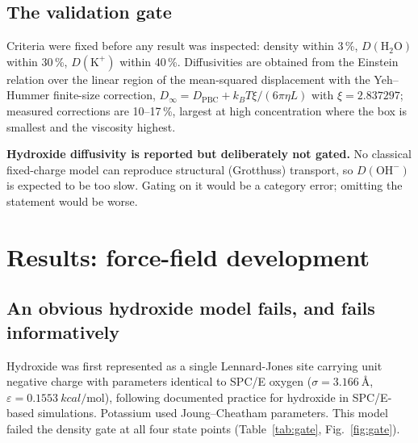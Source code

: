 \documentclass[11pt,a4paper]{article}
\begin{document}
\subsection{The validation gate}
Criteria were fixed before any result was inspected: density within 3\,\%, $D(\mathrm{H_2O})$ within
30\,\%, $D(\mathrm{K^+})$ within 40\,\%. Diffusivities are obtained from the Einstein relation over
the linear region of the mean-squared displacement with the Yeh--Hummer finite-size correction,
$D_\infty = D_{\mathrm{PBC}} + k_BT\xi/(6\pi\eta L)$ with $\xi = 2.837297$; measured corrections are
10--17\,\%, largest at high concentration where the box is smallest and the viscosity highest.

\textbf{Hydroxide diffusivity is reported but deliberately not gated.} No classical fixed-charge
model can reproduce structural (Grotthuss) transport, so $D(\mathrm{OH^-})$ is expected to be too
slow. Gating on it would be a category error; omitting the statement would be worse.

\section{Results: force-field development}\label{sec:res-ff}

\subsection{An obvious hydroxide model fails, and fails informatively}

Hydroxide was first represented as a single Lennard-Jones site carrying unit negative charge with
parameters identical to SPC/E oxygen ($\sigma = \SI{3.166}{\angstrom}$,
$\varepsilon = \SI{0.1553}{kcal\per\mole}$), following documented practice for hydroxide in
SPC/E-based simulations. Potassium used Joung--Cheatham parameters. This model failed the density
gate at all four state points (Table~\ref{tab:gate}, Fig.~\ref{fig:gate}).
\end{document}
